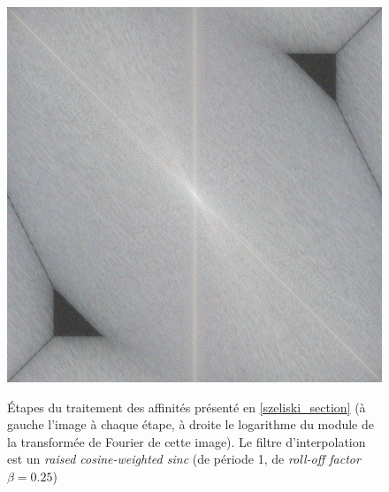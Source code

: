 \begin{figure}
{			{\includegraphics[scale=0.125]{decompoSzeliski_fourier4.png}}
		}
		\caption{Étapes du traitement des affinités présenté en \ref{szeliski_section} (à gauche l'image à chaque étape, à droite le logarithme du module de la transformée de Fourier de cette image). Le filtre d'interpolation est un \emph{raised cosine-weighted sinc} (de période 1, de \emph{roll-off factor} $\beta = 0.25$)}
		\label{experiments_decompoSzeliski}
	\end{figure}

